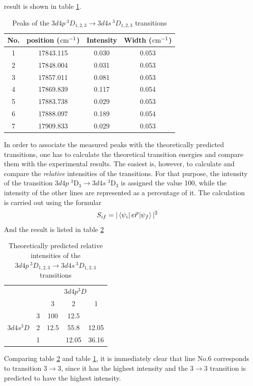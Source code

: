 \documentclass[a4paper]{article}
\begin{document}
result is shown in table \ref{tab:transitions1}.
\begin{table}[htb!]
\centering
\begin{tabular}{c|c|c|c}
\hline
No. & position ($\rm cm^{-1}$) & Intensity & Width ($\rm cm^{-1}$) \\
\hline
1 & 17843.115 & 0.030 & 0.053 \\
2 & 17848.004 & 0.031 & 0.053 \\
3 & 17857.011 & 0.081 & 0.053 \\
4 & 17869.839 & 0.117 & 0.054 \\
5 & 17883.738 & 0.029 & 0.053 \\
6 & 17888.097 & 0.189 & 0.054 \\
7 & 17909.833 & 0.029 & 0.053 \\
\hline
\end{tabular}
\caption{Peaks of the $3d4p\,^3D_{1,2,3} \to 3d4s\,^3D_{1,2,3}$
  transitions}
\label{tab:transitions1}
\end{table}
In order to associate the measured peaks with the theoretically
predicted transitions, one has to calculate the theoretical transition
energies and compare them with the experimental results. The
easiest is, however, to calculate and compare the {\it relative}
intensities of the transitions. For that purpose, the intensity of the
transition $3d4p\;^3\mathrm{D}_3 \to 3d4s\;^3\mathrm{D}_3$ is assigned
the value 100, while the intensity of the other lines are represented
as a percentage of it. The calculation is carried out using the
formular
\[
S_{if} = |\matrixel{\psi_i}{e\vec{r}}{\psi_f}|^2
\]
And the result is listed in table \ref{tab:intensity1}
\begin{table}[htb!]
\centering
\begin{tabular}{cc|c|c|c|}
\cline{3-5}
& & \multicolumn{3}{c|}{$3d4p ^3D$}\\
\cline{3-5}
& & 3 & 2 & 1\\
\hline
\multicolumn{1}{|c|}{\multirow{3}{*}{$3d4s ^3D$}} & 3 & 100 & 12.5 & \\
\multicolumn{1}{|c|}{} & 2 & 12.5 & 55.8 & 12.05 \\
\multicolumn{1}{|c|}{} & 1 & & 12.05 & 36.16 \\
\hline
\end{tabular}
\caption{Theoretically predicted relative intensities of the
  $3d4p\,^3D_{1,2,3} \to 3d4s\,^3D_{1,2,3}$ transitions}
\label{tab:intensity1}
\end{table}

Comparing table \ref{tab:intensity1} and table \ref{tab:transitions1},
it is immediately clear that line No.6 corresponds to transition $3
\to 3$, since it has the highest intensity and the $3 \to 3$
transition is predicted to have the highest intensity.
\end{document}
